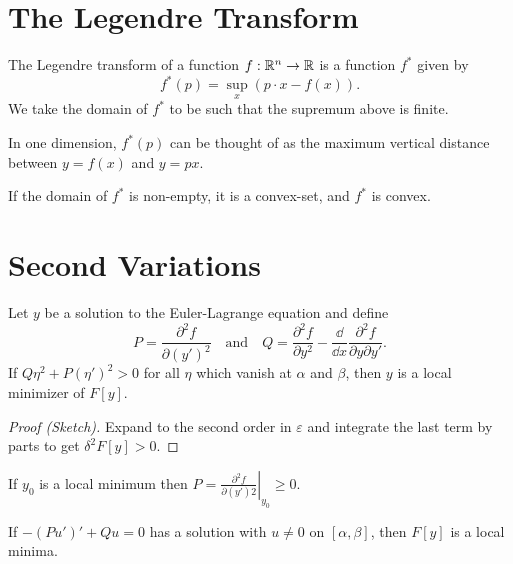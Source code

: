 \documentclass[a4paper]{amsart}
\begin{document}
\section{The Legendre Transform}

\begin{definition}
	The Legendre transform of a function $f: \mathbb{R}^n \rightarrow \mathbb{R}$ is a function $f^*$ given by
	$$
		f^*(p) = \sup_{x}(p \cdot x - f(x)).
	$$
	We take the domain of $f^*$ to be such that the supremum above is finite.
\end{definition}


In one dimension, $f^*(p)$ can be thought of as the maximum vertical distance between $y = f(x)$ and $y = px$.

\begin{proposition}
	If the domain of $f^*$ is non-empty, it is a convex-set, and $f^*$ is convex.
\end{proposition}


\section{Second Variations}

\begin{theorem}
Let $y$ be a solution to the Euler-Lagrange equation and define
$$
P = \frac{\partial^2 f}{\partial (y')^2} \quad \text{and} \quad Q = \frac{\partial^2 f}{\partial y^2} - \frac{\dd}{\dd x} \frac{\partial^2 f}{\partial y \partial y'}.
$$
If $Q \eta^2 + P(\eta')^2 > 0$ for all $\eta$ which vanish at $\alpha$ and $\beta$, then $y$ is a local minimizer of $F[y]$.
\end{theorem}
\begin{proof}[Proof (Sketch)]
Expand to the second order in $\varepsilon$ and integrate the last term by parts to get $\delta^2 F[y] > 0$.
\end{proof}


\begin{theorem}
	If $y_0$ is a local minimum then $P =\left. \frac{\partial^2 f}{\partial (y')2} \right|_{y_0} \geq 0$.
\end{theorem}

\begin{theorem}
	If $-(Pu')' + Qu = 0$ has a solution with $u \neq 0$ on $[\alpha, \beta]$, then $F[y]$ is a local minima.
\end{theorem}
\end{document}
